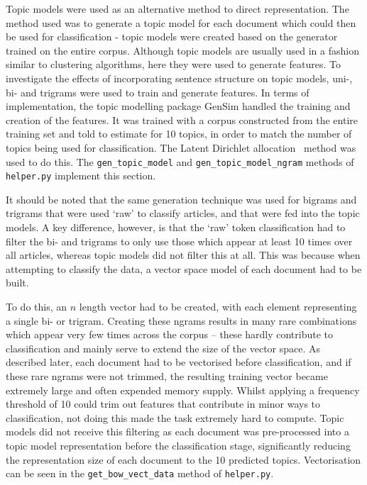 \documentclass[11pt]{article}
\begin{document}
Topic models were used as an alternative method to direct representation. The method used was to generate a topic model for each document which could then be used for classification - topic models were created based on the generator trained on the entire corpus. Although topic models are usually used in a fashion similar to clustering algorithms, here they were used to generate features. To investigate the effects of incorporating sentence structure on topic models, uni-, bi- and trigrams were used to train and generate features. In terms of implementation, the topic modelling package GenSim handled the training and creation of the features. It was trained with a corpus constructed from the entire training set and told to estimate for 10 topics, in order to match the number of topics being used for classification. The Latent Dirichlet allocation~\cite{lda} method was used to do this. The \texttt{gen\_topic\_model} and \texttt{gen\_topic\_model\_ngram} methods of \texttt{helper.py} implement this section.

It should be noted that the same generation technique was used for bigrams and trigrams that were used `raw' to classify articles, and that were fed into the topic models. A key difference, however, is that the `raw' token classification had to filter the bi- and trigrams to only use those which appear at least 10 times over all articles, whereas topic models did not filter this at all. This was because when attempting to classify the data, a vector space model of each document had to be built. 

To do this, an $n$ length vector had to be created, with each element representing a single bi- or trigram. Creating these ngrams results in many rare combinations which appear very few times across the corpus – these hardly contribute to classification and mainly serve to extend the size of the vector space. As described later, each document had to be vectorised before classification, and if these rare ngrams were not trimmed, the resulting training vector became extremely large and often expended memory supply. Whilst applying a frequency threshold of 10 could trim out features that contribute in minor ways to classification, not doing this made the task extremely hard to compute. Topic models did not receive this filtering as each document was pre-processed into a topic model representation before the classification stage, significantly reducing the representation size of each document to the 10 predicted topics. Vectorisation can be seen in the \texttt{get\_bow\_vect\_data} method of \texttt{helper.py}.
\end{document}
